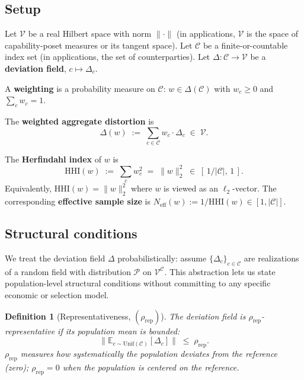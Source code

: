 \documentclass{article}
\newtheorem{definition}{Definition}
\newcommand{\HHI}{\mathrm{HHI}}
\newcommand{\Neff}{N_{\mathrm{eff}}}
\begin{document}
\subsection{Setup}

Let $\mathcal{V}$ be a real Hilbert space with norm $\|\cdot\|$
(in applications, $\mathcal{V}$ is the space of capability-poset
measures or its tangent space).  Let $\mathcal{C}$ be a
finite-or-countable index set (in applications, the set of
counterparties).  Let $\Delta : \mathcal{C} \to \mathcal{V}$ be a
\textbf{deviation field}, $c \mapsto \Delta_c$.

A \textbf{weighting} is a probability measure on $\mathcal{C}$:
$w \in \Delta(\mathcal{C})$ with $w_c \geq 0$ and $\sum_c w_c = 1$.

The \textbf{weighted aggregate distortion} is
\begin{equation}
\label{eq:aggregate-distortion}
  \Delta(w) \;:=\; \sum_{c \in \mathcal{C}} w_c \cdot \Delta_c
  \;\in\; \mathcal{V}.
\end{equation}

The \textbf{Herfindahl index} of $w$ is
\begin{equation}
\label{eq:hhi}
  \HHI(w) \;:=\; \sum_c w_c^2 \;=\; \|w\|_2^2 \;\in\;
  [\,1/|\mathcal{C}|,\, 1\,].
\end{equation}
Equivalently, $\HHI(w) = \|w\|_2^2$ where $w$ is viewed as an
$\ell_2$-vector.  The corresponding \textbf{effective sample size}
is $\Neff(w) := 1/\HHI(w) \in [1, |\mathcal{C}|]$.

\subsection{Structural conditions}

We treat the deviation field $\Delta$ probabilistically: assume
$\{\Delta_c\}_{c \in \mathcal{C}}$ are realizations of a random
field with distribution $\mathcal{P}$ on $\mathcal{V}^\mathcal{C}$.
This abstraction lets us state population-level structural
conditions without committing to any specific economic or
selection model.

\begin{definition}[Representativeness, $(\rho_\mathrm{rep})$]
\label{def:rep}
The deviation field is \emph{$\rho_\mathrm{rep}$-representative}
if its population mean is bounded:
\begin{equation}
\label{eq:rep}
  \big\| \mathbb{E}_{c \sim \mathrm{Unif}(\mathcal{C})}[\Delta_c]
  \big\| \;\leq\; \rho_\mathrm{rep}.
\end{equation}
$\rho_\mathrm{rep}$ measures how systematically the population
deviates from the reference (zero); $\rho_\mathrm{rep} = 0$ when
the population is centered on the reference.
\end{definition}
\end{document}
